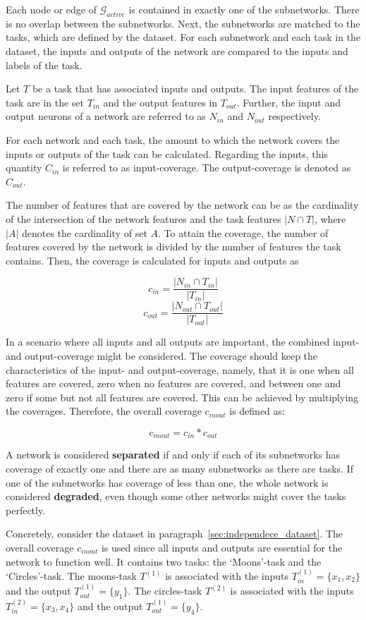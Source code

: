 Each node or edge of $\mathcal{G}_{active}$ is contained in exactly one of the subnetworks.
There is no overlap between the subnetworks.
Next, the subnetworks are matched to the tasks, which are defined by the dataset.
For each subnetwork and each task in the dataset, the inputs and outputs of the network are compared to the inputs and labels of the task.

Let $T$ be a task that has associated inputs and outputs.
The input features of the task are in the set $T_{in}$ and the output features in $T_{out}$.
Further, the input and output neurons of a network are referred to as $N_{in}$ and $N_{out}$ respectively.

For each network and each task, the amount to which the network covers the inputs or outputs of the task can be calculated.
Regarding the inputs, this quantity $C_{in}$ is referred to as input-coverage. The output-coverage is denoted as $C_{out}$.

The number of features that are covered by the network can be as the cardinality of the intersection of the network features and the task features $ |N \cap T|$, where  $|A|$ denotes the cardinality of set $A$.
To attain the coverage, the number of features covered by the network is divided by the number of features the task contains.
Then, the coverage is calculated for inputs and outputs as 

\[
c_{in} = \frac{|N_{in}  \cap T_{in} |}{|T_{in} |}
\]
\[
c_{out} = \frac{|N_{out}  \cap T_{out} |}{|T_{out}|}
\]

In a scenario where all inputs and all outputs are important, the combined input- and output-coverage might be considered.
The coverage should keep the characteristics of the input- and output-coverage, namely, that it is one when all features are covered, zero when no features are covered, and between one and zero if some but not all features are covered.
This can be achieved by multiplying the coverages.
Therefore, the overall coverage $c_{inout}$ is defined as:

\[
    c_{inout} = c_{in} * c_{out}
\]

A network is considered \textbf{separated} if and only if each of its subnetworks has coverage of exactly one and there are as many subnetworks as there are tasks.
If one of the subnetworks has coverage of less than one, the whole network is considered \textbf{degraded}, even though some other networks might cover the tasks perfectly.

Concretely, consider the dataset in paragraph~\ref{sec:independece_dataset}.
The overall coverage $c_{inout}$ is used since all inputs and outputs are essential for the network to function well.
It contains two tasks: the `Moons'-task and the `Circles'-task. 
The moons-task $T^{(1)}$ is associated with the inputs $T^{(1)}_{in} = \{x_1,x_2\}$ and the output $T^{(1)}_{out} = \{y_1\}$.
The circles-task $T^{(2)}$ is associated with the inputs $T^{(2)}_{in} = \{x_3,x_4\}$ and the output $T^{(1)}_{out} = \{y_4\}$.

